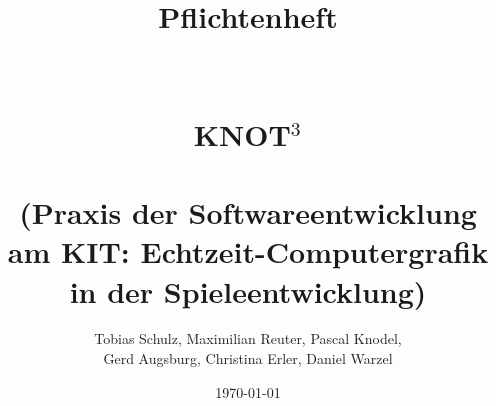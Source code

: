 \documentclass{scrreprt}
\begin{document}
\title{Pflichtenheft\\~\\~\\\Huge{KNOT$^3$}\\~\\\Large (Praxis der Softwareentwicklung am KIT: Echtzeit-Computergrafik in der Spieleentwicklung)}
\author{Tobias Schulz, Maximilian Reuter, Pascal Knodel, \\Gerd Augsburg, Christina Erler, Daniel Warzel} 
\date{\today}

\maketitle

\tableofcontents



















\end{document}
